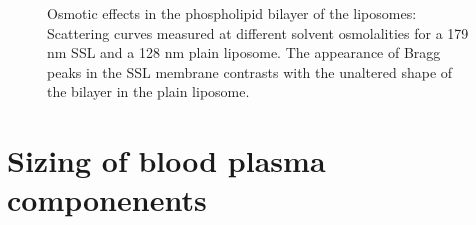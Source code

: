 \begin{figure}
	\centering
		\subfloat[PEG 179 nm]{\resizebox{0.5\linewidth}{!}{\figfont{10pt}}\label{fig:SSLContrastCurvesBilayer200SSL}}
		\subfloat[Plain 128 nm]{\resizebox{0.5\linewidth}{!}{\figfont{10pt}}\label{fig:SSLContrastCurvesBilayer100Plain}}
		\caption[Osmotic effects in the phospholipid bilayer of the liposomes.]{Osmotic effects in the phospholipid bilayer of the liposomes: Scattering curves measured at different solvent osmolalities for a 179 nm SSL and a 128 nm plain liposome. The appearance of Bragg peaks in the SSL membrane contrasts with the unaltered shape of the bilayer in the plain liposome.}
\end{figure}





\section{Sizing of blood plasma componenents}
\label{sec:lipoprotein_continuous}


